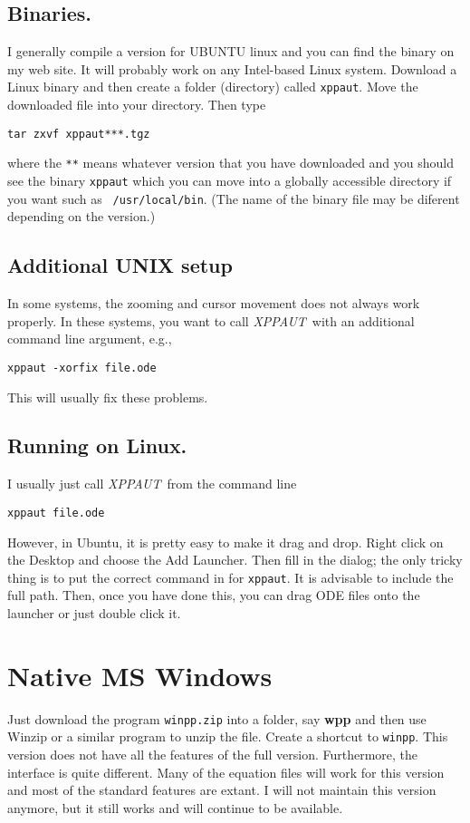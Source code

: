 \documentclass{article}
\newcommand{\XPP}{{\sl XPPAUT\, }}
\begin{document}
\subsection{Binaries.} I generally compile a version for UBUNTU linux
and you can find the binary on my web site. It will probably work on any
Intel-based Linux system.  Download a Linux binary and then create a
folder (directory) called {\tt xppaut}. Move the downloaded file into
your directory. Then type 
\begin{verbatim}
tar zxvf xppaut***.tgz
\end{verbatim}
where the {\tt ***} means whatever version that you have downloaded
and you should see the binary {\tt xppaut} which you can move into a
globally accessible directory if you want such as {\tt
/usr/local/bin}. (The name of the binary file may be diferent depending on the version.) 
\subsection{Additional UNIX setup} In some systems, the zooming
and cursor movement does not always work properly.  In these systems,
you want to call \XPP with an additional command line argument, e.g., 
\begin{verbatim}
xppaut -xorfix file.ode 
\end{verbatim}
This will usually fix these problems.

\subsection{Running on Linux.}
I usually just call \XPP from the command line
\begin{verbatim}
xppaut file.ode
\end{verbatim}
However, in Ubuntu, it is pretty easy to make it drag and drop. Right
click on the Desktop and choose the Add Launcher. Then fill in the
dialog; the only tricky thing is to put the correct command in for
{\tt xppaut}. It is advisable to include the full path. Then, once you
have done this, you can drag ODE files onto the launcher or just
double click it.


\section{Native MS Windows} 
Just download the program {\tt winpp.zip} into a folder, say {\bf wpp}
and then use Winzip or a similar program to unzip the file. Create a
shortcut to {\tt winpp}.  This version does not have all the features
of the full version. Furthermore, the interface is quite
different. Many of the equation files will work for this version and
most of the standard features are extant. I will not maintain this
version anymore, but it still works and will continue to be available.
\end{document}
